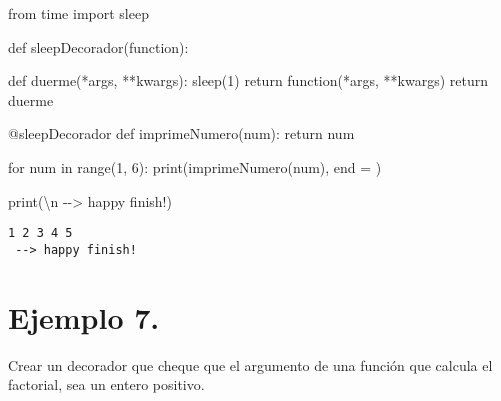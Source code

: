 \documentclass[
  letterpaper,
  DIV=11,
  numbers=noendperiod]{scrreprt}
\newenvironment{Shaded}{\begin{snugshade}}{\end{snugshade}}
\newcommand{\AttributeTok}[1]{\textcolor[rgb]{0.40,0.45,0.13}{#1}}
\newcommand{\BuiltInTok}[1]{\textcolor[rgb]{0.00,0.23,0.31}{#1}}
\newcommand{\CharTok}[1]{\textcolor[rgb]{0.13,0.47,0.30}{#1}}
\newcommand{\ControlFlowTok}[1]{\textcolor[rgb]{0.00,0.23,0.31}{#1}}
\newcommand{\DecValTok}[1]{\textcolor[rgb]{0.68,0.00,0.00}{#1}}
\newcommand{\ImportTok}[1]{\textcolor[rgb]{0.00,0.46,0.62}{#1}}
\newcommand{\KeywordTok}[1]{\textcolor[rgb]{0.00,0.23,0.31}{#1}}
\newcommand{\NormalTok}[1]{\textcolor[rgb]{0.00,0.23,0.31}{#1}}
\newcommand{\OperatorTok}[1]{\textcolor[rgb]{0.37,0.37,0.37}{#1}}
\newcommand{\StringTok}[1]{\textcolor[rgb]{0.13,0.47,0.30}{#1}}
\begin{document}
\begin{Shaded}
\begin{Highlighting}[]
\ImportTok{from}\NormalTok{ time }\ImportTok{import}\NormalTok{ sleep}

\KeywordTok{def}\NormalTok{ sleepDecorador(function):}

    \KeywordTok{def}\NormalTok{ duerme(}\OperatorTok{*}\NormalTok{args, }\OperatorTok{**}\NormalTok{kwargs):}
\NormalTok{        sleep(}\DecValTok{1}\NormalTok{)}
        \ControlFlowTok{return}\NormalTok{ function(}\OperatorTok{*}\NormalTok{args, }\OperatorTok{**}\NormalTok{kwargs)}
    \ControlFlowTok{return}\NormalTok{ duerme}


\AttributeTok{@sleepDecorador}
\KeywordTok{def}\NormalTok{ imprimeNumero(num):}
    \ControlFlowTok{return}\NormalTok{ num}

\ControlFlowTok{for}\NormalTok{ num }\KeywordTok{in} \BuiltInTok{range}\NormalTok{(}\DecValTok{1}\NormalTok{, }\DecValTok{6}\NormalTok{):}
    \BuiltInTok{print}\NormalTok{(imprimeNumero(num), end }\OperatorTok{=} \StringTok{\textquotesingle{} \textquotesingle{}}\NormalTok{)}

\BuiltInTok{print}\NormalTok{(}\StringTok{\textquotesingle{}}\CharTok{\textbackslash{}n}\StringTok{ {-}{-}\textgreater{} happy finish!\textquotesingle{}}\NormalTok{)}
\end{Highlighting}
\end{Shaded}

\begin{verbatim}
1 2 3 4 5 
 --> happy finish!
\end{verbatim}

\section{\texorpdfstring{\textbf{Ejemplo
7.}}{Ejemplo 7.}}\label{ejemplo-7.-3}

Crear un decorador que cheque que el argumento de una función que
calcula el factorial, sea un entero positivo.
\end{document}
